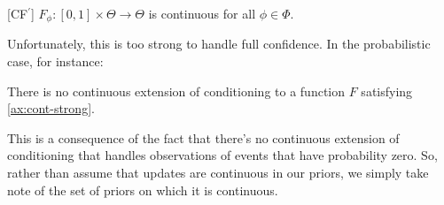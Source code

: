 \begin{CFaxioms}[nosep]
	\item
	[CF{\the\numexpr\value{CFaxiomsi}\relax}${^\prime}$]
	$F_\phi : [0,1] \times \Theta \to \Theta$ is continuous
	for all $\phi \in \Phi$.
	\label{ax:cont-strong}
\end{CFaxioms}

Unfortunately, this is too strong to handle full confidence.
In the probabilistic case, for instance:


%
\begin{prop}
	There is no continuous extension of conditioning to a function
	$F$ satisfying \cref{ax:cont-strong}.
\end{prop}
This is a consequence of the fact that there's no 
continuous extension of conditioning that handles
observations of events that have probability zero.
%
So, rather than assume that updates are continuous in our priors, we
simply take note of the set of priors on which it is continuous.

